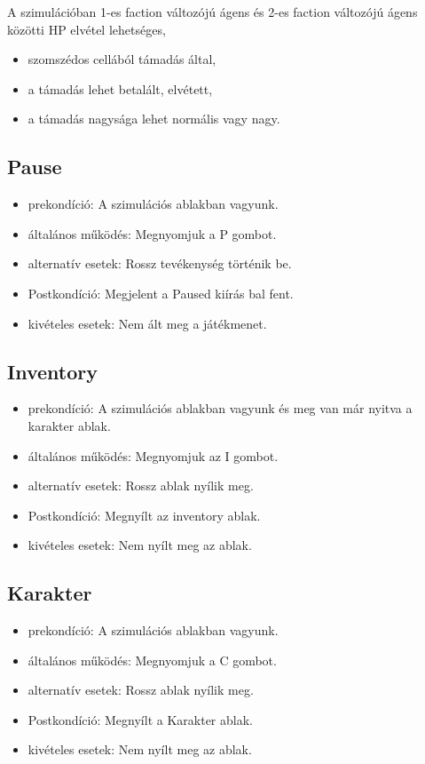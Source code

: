 A szimulációban 1-es faction változójú ágens és 2-es faction változójú ágens közötti HP elvétel lehetséges,

\begin{itemize}
    \item szomszédos cellából támadás által,
    \item a támadás lehet betalált, elvétett,
    \item a támadás nagysága lehet normális vagy nagy.
\end{itemize}


\subsection{Pause}

\begin{itemize}
    \item prekondíció: A szimulációs ablakban vagyunk.
    \item általános működés: Megnyomjuk a P gombot.
    \item alternatív esetek: Rossz tevékenység történik be.
    \item Postkondíció: Megjelent a Paused kiírás bal fent.
    \item kivételes esetek: Nem ált meg a játékmenet.
\end{itemize}

\subsection{Inventory}

\begin{itemize}
    \item prekondíció: A szimulációs ablakban vagyunk és meg van már nyitva a karakter ablak.
    \item általános működés: Megnyomjuk az I gombot.
    \item alternatív esetek: Rossz ablak nyílik meg.
    \item Postkondíció: Megnyílt az inventory ablak.
    \item kivételes esetek: Nem nyílt meg az ablak.
\end{itemize}

\subsection{Karakter}

\begin{itemize}
    \item prekondíció: A szimulációs ablakban vagyunk.
    \item általános működés: Megnyomjuk a C gombot.
    \item alternatív esetek: Rossz ablak nyílik meg.
    \item Postkondíció: Megnyílt a Karakter ablak.
    \item kivételes esetek: Nem nyílt meg az ablak.
\end{itemize}

